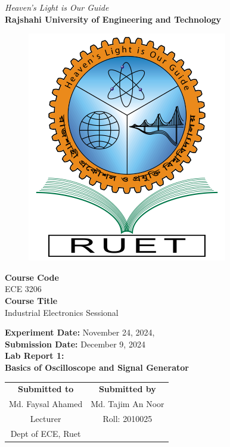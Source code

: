 \vspace*{\fill}
\begin{center}

    \emph{Heaven's Light is Our Guide} \\
    \textbf{Rajshahi University of Engineering and Technology} \\

    \begin{figure}[H]
        \centering
        \includegraphics[scale=.34]{images/RUET_logo.png}
        \label{fig:ruet_logo}
    \end{figure}
    \vspace{5mm}

    \textbf{Course Code}\\
    ECE 3206\\
    \vspace{3mm}
    \textbf{Course Title}\\
    Industrial Electronics Sessional

    \vspace{5mm}
    \textbf{Experiment Date:} {November 24, 2024},\\
    \textbf{Submission Date:} {December 9, 2024}\\

    \vspace{5mm}
    \textbf{Lab Report 1: \\
        Basics of Oscilloscope and Signal Generator}

    \vspace{15mm}

    \begin{tabular}{c|c}
        \textbf{Submitted to} & \textbf{Submitted by} \\
        Md. Faysal Ahamed     & Md. Tajim An Noor     \\
        Lecturer              & Roll: 2010025         \\
        Dept of ECE, Ruet     &                       \\
    \end{tabular}

\end{center}
\vspace*{\fill}
